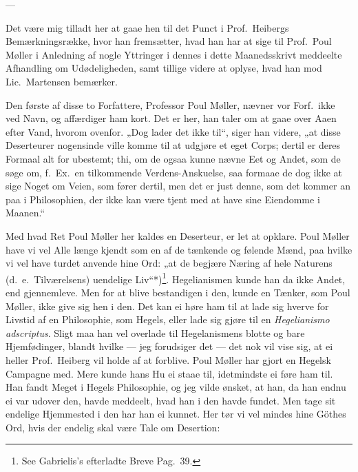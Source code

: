 \documentclass[12pt,a4paper]{book}
\newcommand{\apage}[1]{\marginnote{\footnotesize\textit{[#1]}}}
\begin{document}
\begin{center}---\end{center}

Det være mig tilladt her at gaae hen til det Punct i Prof.\ Heibergs
Bemærkningsrække, hvor han fremsætter, hvad han har at sige til Prof.\
Poul Møller i Anledning af nogle Yttringer i dennes i dette
Maanedsskrivt meddeelte Afhandling om Udødeligheden, samt tillige videre
at oplyse, hvad han mod Lic.\ Martensen bemærker.

Den første af disse to Forfattere, Professor Poul Møller, nævner vor
Forf.\ ikke ved Navn, og affærdiger ham kort. Det er her, han taler om
at gaae over Aaen efter Vand, hvorom ovenfor. „Dog lader det ikke til“,
siger han videre, „at disse Deserteurer nogensinde ville komme til at
udgjøre et eget Corps; dertil er deres Formaal alt for ubestemt; thi,
om de ogsaa kunne nævne Eet og Andet, som de søge om, f.\ Ex.\ en
tilkommende Verdens-Anskuelse, saa formaae de dog ikke at sige Noget om
Veien, som fører dertil, men det er just denne, som det kommer \apage{54} an paa i
Philosophien, der ikke kan være tjent med at have sine Eiendomme i
Maanen.“

Med hvad Ret Poul Møller her kaldes en Deserteur, er let at opklare.
Poul Møller have vi vel Alle længe kjendt som en af de tænkende og
følende Mænd, paa hvilke vi vel have turdet anvende hine Ord: „at de
begjære Næring af hele Naturens (d.\ e.\ Tilværelsens) uendelige
Liv“*)\footnote{See Gabrielis's efterladte Breve Pag.\ 39.}.
Hegelianismen kunde han da ikke Andet, end gjennemleve. Men for at
blive bestandigen i den, kunde en Tænker, som Poul Møller, ikke give
sig hen i den. Det kan ei høre ham til at lade sig hverve for Livstid
af en Philosophie, som Hegels, eller lade sig gjøre til en
\textit{Hegelianismo adscriptus}. Sligt maa han vel overlade til
Hegelanismens blotte og bare Hjemfødinger, blandt hvilke --- jeg
forudsiger det --- det nok vil vise sig, at ei heller Prof.\ Heiberg vil
holde af at forblive. Poul Møller har gjort en Hegelsk Campagne med.
Mere kunde hans Hu ei staae til, idetmindste ei føre ham til. Han fandt
Meget i Hegels Philosophie, og jeg vilde ønsket, at han, da han endnu
ei var udover den, havde meddeelt, hvad han i den havde fundet. Men
tage sit endelige Hjemmested i den har han ei kunnet. Her tør vi vel
mindes hine Göthes Ord, hvis der endelig skal være Tale om Desertion:
\end{document}
